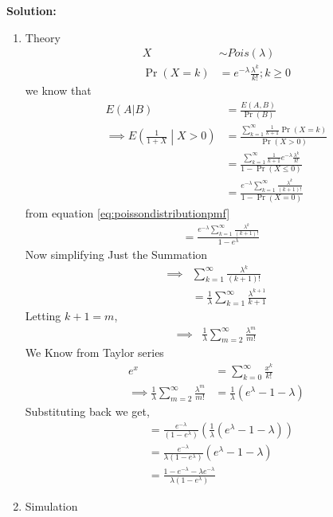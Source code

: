 \documentclass[journal,11pt,twocolumn]{IEEEtran}
\providecommand{\pr}[1]{\ensuremath{\Pr\left(#1\right)}}
\providecommand{\brak}[1]{\ensuremath{\left(#1\right)}}
\providecommand{\cond}[2]{#1\middle|#2}
\newcommand{\solution}{\noindent \textbf{Solution: }}
\providecommand{\pr}[1]{\ensuremath{\Pr\left(#1\right)}}
\begin{document}
\solution
\\
\begin{enumerate}[label=(\Alph*)]
	\item Theory
\begin{align}
	X&\sim Pois\brak{\lambda}\\
	\pr{X=k}&=e^{-\lambda} \frac{\lambda^k}{k!}; k \geq 0 \label{eq:poissondistributionpmf}
\end{align}
we know that 
\begin{align}
	E\brak{A|B}&=\frac{E\brak{A,B}}{\pr{B}}\\
	\implies E\brak{\cond{\frac{1}{1+X}}{X>0}} &=\frac{\sum_{k=1}^{\infty}\frac{1}{k+1}\pr{X=k}}{\pr{X>0}}\\
	&=\frac{\sum_{k=1}^{\infty}\frac{1}{k+1} e^{-\lambda}\frac{\lambda^k}{k!}}{1-\pr{X\leq 0}}\\
	&=\frac{e^{-\lambda}\sum_{k=1}^{\infty}\frac{\lambda^k}{\brak{k+1}!}}{1-\pr{X=0}}
\end{align}
from equation \eqref{eq:poissondistributionpmf}
\begin{align}
	&=\frac{e^{-\lambda}\sum_{k=1}^{\infty}\frac{\lambda^k}{\brak{k+1}!}}{1-e^{\lambda}}
\end{align}
Now simplifying Just the Summation
\begin{align}
	\implies & \sum_{k=1}^{\infty} \frac{\lambda^k}{\brak{k+1}!}\\
	&=\frac{1}{\lambda} \sum_{k=1}^{\infty} \frac{\lambda^{k+1}}{k+1}
\end{align}
Letting $k+1 =m $,
\begin{align}
	\implies & \frac{1}{\lambda} \sum_{m=2}^{\infty} \frac{\lambda^m}{m!}
\end{align}
We Know from Taylor series
\begin{align}
	e^x&=\sum_{k=0}^{\infty} \frac{x^k}{k!}\\
	\implies \frac{1}{\lambda} \sum_{m=2}^{\infty} \frac{\lambda^m}{m!}&= \frac{1}{\lambda}\brak{e^{\lambda}-1-\lambda}
\end{align}
Substituting back we get,
\begin{align}
	&=\frac{e^{-\lambda}}{ \brak{1-e^{\lambda}}}\brak{\frac{1}{\lambda} \brak{e^{\lambda}-1-\lambda}}\\
	&=\frac{e^{-\lambda}}{\lambda \brak{1-e^{\lambda}}}\brak{e^{\lambda}-1 -\lambda}\\
	&=\frac{1-e^{-\lambda}-\lambda e^{-\lambda}}{\lambda \brak{1-e^{\lambda}}}
\end{align}
\item Simulation\\

\end{enumerate}
\end{document}
